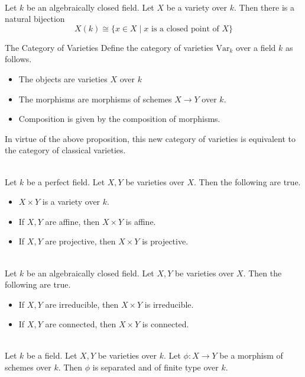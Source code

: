 \documentclass[a4paper]{article}
\begin{document}
\begin{crl}{}{}\\
Let $k$ be an algebraically closed field. Let $X$ be a variety over $k$. Then there is a natural bijection $$X(k)\cong\{x\in X\;|\;x\text{ is a closed point of }X\}$$
\end{crl}

\begin{defn}{The Category of Varieties}{} Define the category of varieties $\text{Var}_k$ over a field $k$ as follows. 
\begin{itemize}
\item The objects are varieties $X$ over $k$
\item The morphisms are morphisms of schemes $X\to Y$ over $k$. 
\item Composition is given by the composition of morphisms. 
\end{itemize}
\end{defn}

In virtue of the above proposition, this new category of varieties is equivalent to the category of classical varieties. 

\begin{prp}{}{}\\
Let $k$ be a perfect field. Let $X,Y$ be varieties over $X$. Then the following are true. 
\begin{itemize}
\item $X\times Y$ is a variety over $k$. 
\item If $X,Y$ are affine, then $X\times Y$ is affine. 
\item If $X,Y$ are projective, then $X\times Y$ is projective. 
\end{itemize}
\end{prp}

\begin{prp}{}{}\\
Let $k$ be an algebraically closed field. Let $X,Y$ be varieties over $X$. Then the following are true. 
\begin{itemize}
\item If $X,Y$ are irreducible, then $X\times Y$ is irreducible. 
\item If $X,Y$ are connected, then $X\times Y$ is connected. 
\end{itemize}
\end{prp}

\begin{prp}{}{}\\
Let $k$ be a field. Let $X,Y$ be varieties over $k$. Let $\phi:X\to Y$ be a morphism of schemes over $k$. Then $\phi$ is separated and of finite type over $k$. 
\end{prp}
\end{document}
